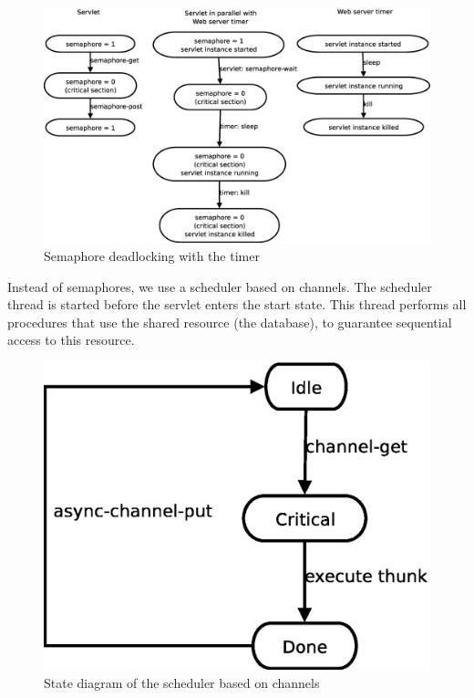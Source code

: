 \documentclass[a4paper]{article}
\begin{document}
\begin{figure}[ht]
\centering
\includegraphics[scale=.30]{semaphore-deadlock.eps}
\caption{Semaphore deadlocking with the timer}
\label{fig:semaphores}
\end{figure}

Instead of semaphores, we use a scheduler based on channels. The scheduler
thread is started before the servlet enters the start state. This thread
performs all procedures that use the shared resource (the database), to
guarantee sequential access to this resource.

\begin{figure}[ht]
\centering
\includegraphics[scale=.30]{channel.eps}
\caption{State diagram of the scheduler based on channels}
\label{fig:channel}
\end{figure}
\end{document}
